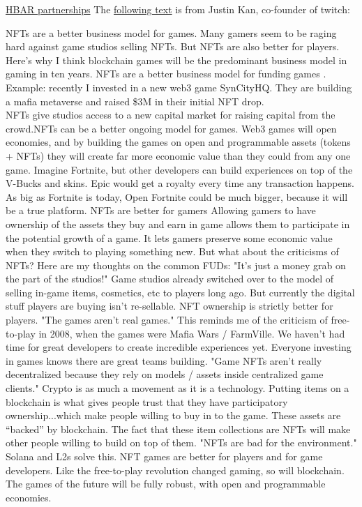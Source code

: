 \href{https://www.prnewswire.com/news-releases/hbar-foundation-and-ubisoft-partner-to-support-growth-of-gaming-on-hedera-network-301474971.html}{HBAR partnerships}
The \href{https://twitter.com/justinkan/status/1491270239967154178}{following text} is from Justin Kan, co-founder of twitch:
\begin{fminipage}{\textwidth}
NFTs are a better business model for games. Many gamers seem to be raging hard against game studios selling NFTs. But NFTs are also better for players. Here’s why I think blockchain games will be the predominant business model in gaming in ten years. NFTs are a better business model for funding games . Example: recently I invested in a new web3 game SynCityHQ. They are building a mafia metaverse and raised \$3M in their initial NFT drop.\\
NFTs give studios access to a new capital market for raising capital from the crowd.NFTs can be a better ongoing model for games. Web3 games will open economies, and by building the games on open and programmable assets (tokens + NFTs) they will create far more economic value than they could from any one game. Imagine Fortnite, but other developers can build experiences on top of the V-Bucks and skins. Epic would get a royalty every time any transaction happens. As big as Fortnite is today, Open Fortnite could be much bigger, because it will be a true platform. NFTs are better for gamers Allowing gamers to have ownership of the assets they buy and earn in game allows them to participate in the potential growth of a game. It lets gamers preserve some economic value when they switch to playing something new. But what about the criticisms of NFTs?
Here are my thoughts on the common FUDs: "It’s just a money grab on the part of the studios!"
Game studios already switched over to the model of selling in-game items, cosmetics, etc to players long ago. But currently the digital stuff players are buying isn’t re-sellable. NFT ownership is strictly better for players. "The games aren’t real games." This reminds me of the criticism of free-to-play in 2008, when the games were Mafia Wars / FarmVille. We haven’t had time for great developers to create incredible experiences yet. Everyone investing in games knows there are great teams building. "Game NFTs aren’t really decentralized because they rely on models / assets inside centralized game clients."
Crypto is as much a movement as it is a technology. Putting items on a blockchain is what gives people trust that they have participatory ownership...which make people willing to buy in to the game. These assets are “backed” by blockchain.
The fact that these item collections are NFTs will make other people willing to build on top of them. "NFTs are bad for the environment." Solana and L2s solve this. NFT games are better for players and for game developers. Like the free-to-play revolution changed gaming, so will blockchain. The games of the future will be fully robust, with open and programmable economies.
\end{fminipage}




